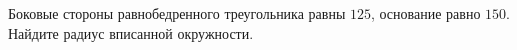 \begin{ex}
	\begin{condition}
		Боковые стороны равнобедренного треугольника равны \( 125 \), основание равно \( 150 \). Найдите радиус вписанной окружности.
	\end{condition}
\end{ex}
